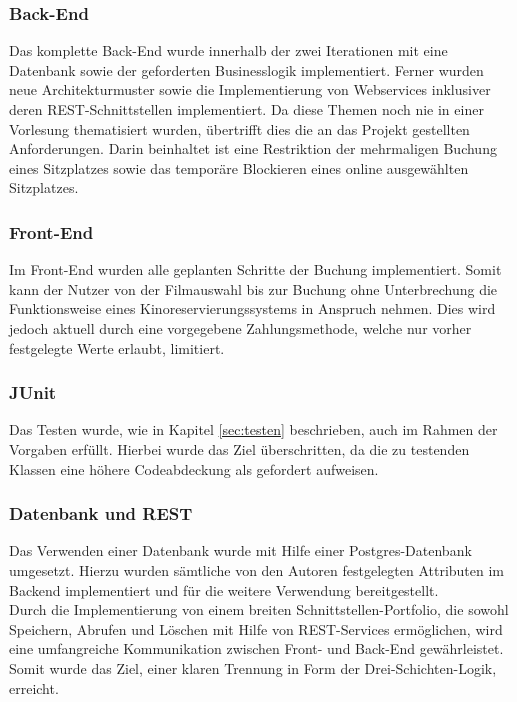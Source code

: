 \subsubsection*{Back-End}
Das komplette Back-End wurde innerhalb der zwei Iterationen mit eine Datenbank sowie der geforderten Businesslogik implementiert. Ferner wurden neue Architekturmuster sowie die Implementierung von Webservices inklusiver deren \acs{REST}-Schnittstellen implementiert. Da diese Themen noch nie in einer Vorlesung thematisiert wurden, übertrifft dies die an das Projekt gestellten Anforderungen. Darin beinhaltet ist eine Restriktion der mehrmaligen Buchung eines Sitzplatzes sowie das temporäre Blockieren eines online ausgewählten Sitzplatzes.

\subsubsection*{Front-End}
Im Front-End wurden alle geplanten Schritte der Buchung implementiert. 
Somit kann der Nutzer von der Filmauswahl bis zur Buchung ohne Unterbrechung die Funktionsweise eines Kinoreservierungssystems in Anspruch nehmen. Dies wird jedoch aktuell durch eine vorgegebene Zahlungsmethode, welche nur vorher festgelegte Werte erlaubt, limitiert.

\subsubsection*{JUnit}
Das Testen wurde, wie in Kapitel \vref{sec:testen} beschrieben, auch im Rahmen der Vorgaben erfüllt. Hierbei wurde das Ziel überschritten, da die zu testenden Klassen eine höhere Codeabdeckung als gefordert aufweisen.

\subsubsection*{Datenbank und \acf{REST}}
Das Verwenden einer Datenbank wurde mit Hilfe einer Postgres-Datenbank umgesetzt.
Hierzu wurden sämtliche von den Autoren festgelegten Attributen im Backend implementiert und für die weitere Verwendung bereitgestellt.\\
Durch die Implementierung von einem breiten Schnittstellen-Portfolio, die sowohl Speichern, Abrufen und Löschen mit Hilfe von \acs{REST}-Services ermöglichen, wird eine umfangreiche Kommunikation zwischen Front- und Back-End gewährleistet. \\
Somit wurde das Ziel, einer klaren Trennung in Form der Drei-Schichten-Logik, erreicht.

